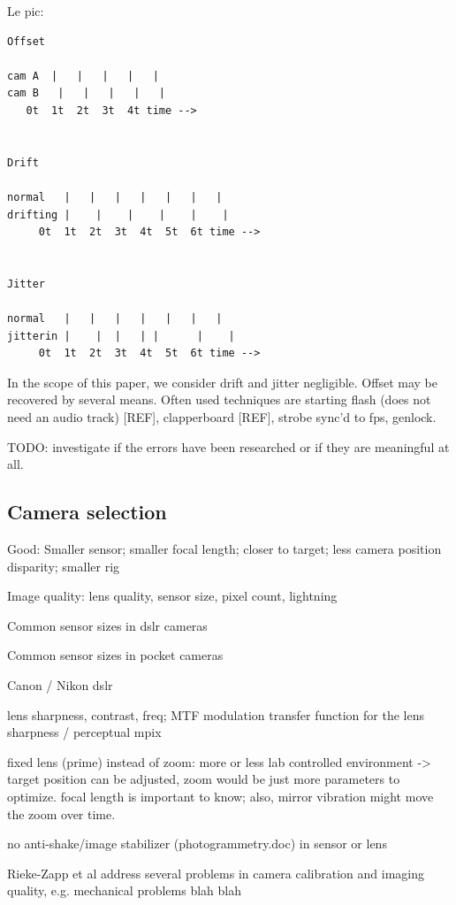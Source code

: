 Le pic:

\begin{verbatim}
Offset

cam A  |   |   |   |   |
cam B   |   |   |   |   |
   0t  1t  2t  3t  4t time -->


Drift

normal   |   |   |   |   |   |   |
drifting |    |    |    |    |    |
	 0t  1t  2t  3t  4t  5t  6t time -->


Jitter

normal   |   |   |   |   |   |   |
jitterin |    |  |   | |      |    |
	 0t  1t  2t  3t  4t  5t  6t time -->
\end{verbatim}

In the scope of this paper, we consider drift and jitter negligible.
Offset may be recovered by several means.
Often used techniques are starting flash (does not need an audio track) [REF], clapperboard [REF], strobe sync'd to fps, genlock.

TODO: investigate if the errors have been researched or if they are meaningful at all.


\subsection{Camera selection}

Good: Smaller sensor; smaller focal length; closer to target; less camera position disparity; smaller rig

Image quality: lens quality, sensor size, pixel count, lightning

Common sensor sizes in dslr cameras

Common sensor sizes in pocket cameras

Canon / Nikon dslr


lens sharpness, contrast, freq; MTF modulation transfer function for the lens sharpness / perceptual mpix

fixed lens (prime) instead of zoom: more or less lab controlled environment -> target position can be adjusted, zoom would be just more parameters to optimize. focal length is important to know; also, mirror vibration might move the zoom over time.

no anti-shake/image stabilizer  (photogrammetry.doc) in sensor or lens

Rieke-Zapp et al \cite{rieke2009evaluation} address several problems in camera calibration and imaging quality, e.g. mechanical problems blah blah

